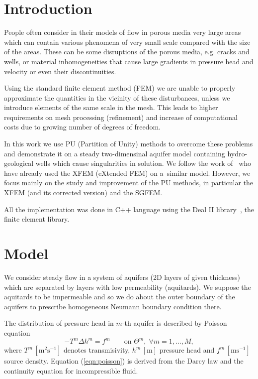 \documentclass[preprint,12pt,authoryear]{elsarticle}
\begin{document}

\section{Introduction}
\label{sec:introduction}

People often consider in their models of flow in porous media very large areas which can contain various 
phenomena of very small scale compared with the size of the areas. These can be some disruptions of the porous 
media, e.g. cracks and wells, or material inhomogeneities that cause large gradients in pressure head and 
velocity or even their discontinuities.

Using the standard finite element method (FEM) we are unable to properly approximate the quantities in the 
vicinity of these disturbances, unless we introduce elements of the same scale in the mesh. This leads to 
higher requirements on mesh processing (refinement) and increase of computational costs due to growing number  
of degrees of freedom.

In this work we use PU (Partition of Unity) methods to overcome these problems and demonstrate it on a steady 
two-dimensinal aquifer model containing hydro-geological wells which cause singularities in solution. 
We follow the work of~\cite{gracie} who have already used the XFEM (eXtended FEM) on a~similar model. 
However, we focus mainly on the study and improvement of the PU methods, in particular the XFEM (and its 
corrected version) and the SGFEM. 
 
All the implementation was done in C++ language using the Deal II library~\citep{deal}, the finite element library.

\section{Model}
\label{sec:model}
We consider steady flow in a system of aquifers (2D layers of given thickness) which are separated by layers with low permeability (aquitards). 
We suppose the aquitards to be impermeable and so we do about the outer boundary of the aquifers to prescribe homogeneous Neumann 
boundary condition there. 

The distribution of pressure head in $m$-th aquifer is described by Poisson equation
\begin{equation} 
-T^m\Delta{}h^m = f^m  \qquad \textrm{on } \Theta^m,\; \forall m=1,\dots,M, \label{eqn:poisson}
\end{equation}
where $T^m\, [\textrm{m}^2\textrm{s}^{-1}]$ denotes transmisivity, $h^m\, [\textrm{m}]$ pressure head 
and $f^m\, [\textrm{m}\textrm{s}^{-1}]$ source density. Equation (\ref{eqn:poisson}) is derived from the Darcy law and
the continuity equation for incompressible fluid.
\end{document}
